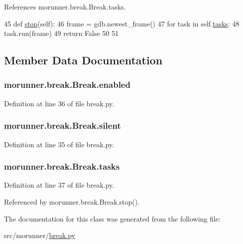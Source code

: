 References morunner.\+break.\+Break.\+tasks.


\begin{DoxyCode}
45     \textcolor{keyword}{def }\hyperlink{classmorunner_1_1break_1_1Break_ae53ddba489aac5ad45172f9c4ad6f634}{stop}(self):
46         frame = gdb.newest\_frame()
47         \textcolor{keywordflow}{for} task \textcolor{keywordflow}{in} self.\hyperlink{classmorunner_1_1break_1_1Break_a7d62d6a7a0f7f526ca0a15363eda01d6}{tasks}:
48             task.run(frame)
49         \textcolor{keywordflow}{return} \textcolor{keyword}{False}
50 
51 \end{DoxyCode}


\subsection{Member Data Documentation}
\hypertarget{classmorunner_1_1break_1_1Break_a0ca27884fb0c27084b04fb7ab17a7476}{}
\subsubsection[{enabled}]{\setlength{\rightskip}{0pt plus 5cm}morunner.\+break.\+Break.\+enabled}\label{classmorunner_1_1break_1_1Break_a0ca27884fb0c27084b04fb7ab17a7476}


Definition at line 36 of file break.\+py.

\hypertarget{classmorunner_1_1break_1_1Break_a4f411d3199721dd388f4511d4075a0cc}{}
\subsubsection[{silent}]{\setlength{\rightskip}{0pt plus 5cm}morunner.\+break.\+Break.\+silent}\label{classmorunner_1_1break_1_1Break_a4f411d3199721dd388f4511d4075a0cc}


Definition at line 35 of file break.\+py.

\hypertarget{classmorunner_1_1break_1_1Break_a7d62d6a7a0f7f526ca0a15363eda01d6}{}
\subsubsection[{tasks}]{\setlength{\rightskip}{0pt plus 5cm}morunner.\+break.\+Break.\+tasks}\label{classmorunner_1_1break_1_1Break_a7d62d6a7a0f7f526ca0a15363eda01d6}


Definition at line 37 of file break.\+py.



Referenced by morunner.\+break.\+Break.\+stop().



The documentation for this class was generated from the following file\+:\begin{DoxyCompactItemize}
\item 
src/morunner/\hyperlink{break_8py}{break.\+py}\end{DoxyCompactItemize}
